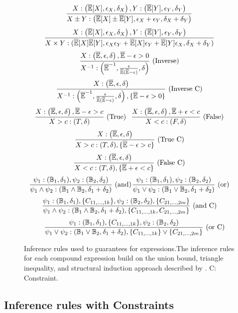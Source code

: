 \begin{subappendices}
\begin{figure}
\[
\dfrac{X: \left(\overline{\mathbb{E}}[X], \epsilon_X, \delta_X\right), Y: \left(\overline{\mathbb{E}}[Y], \epsilon_Y, \delta_Y\right)}{X \pm Y: \left(\overline{\mathbb{E}}[X] \pm \overline{\mathbb{E}}[Y], \epsilon_X + \epsilon_Y, \delta_X + \delta_Y\right)}
\]
\[
\dfrac{X: \left(\overline{\mathbb{E}}[X], \epsilon_X, \delta_X\right), Y: \left(\overline{\mathbb{E}}[Y], \epsilon_Y, \delta_Y\right)}{ X \times Y: (\overline{\mathbb{E}}[X] \overline{\mathbb{E}}[Y], \epsilon_X \epsilon_Y + \overline{\mathbb{E}}[X] \epsilon_Y + \overline{\mathbb{E}}[Y] \epsilon_X, \delta_X + \delta_Y)} 
\]
\[
\dfrac{X: \left(\overline{\mathbb{E}}, \epsilon, \delta \right), \overline{\mathbb{E}} - \epsilon > 0}{ X^{-1}: \left(\overline{\mathbb{E}}^{-1}, \frac{\epsilon}{\overline{\mathbb{E}} (\overline{\mathbb{E}} - \epsilon)}  , \delta \right)}\text{ (Inverse)} 
\] 
\[
\dfrac{X: \left(\overline{\mathbb{E}}, \epsilon, \delta \right)}{ X^{-1}: \left(\overline{\mathbb{E}}^{-1}, \frac{\epsilon}{\overline{\mathbb{E}} (\overline{\mathbb{E}} - \epsilon)}  , \delta \right), \{ \overline{\mathbb{E}} - \epsilon > 0\}} \text{ (Inverse C)}
\]
\[
\dfrac{X: \left(\overline{\mathbb{E}}, \epsilon, \delta\right), \overline{\mathbb{E}} - \epsilon > c}{ X > c: (T, \delta)} \text{ (True)} \hspace{0.1in} \dfrac{X: \left(\overline{\mathbb{E}}, \epsilon, \delta \right), \overline{\mathbb{E}}  + \epsilon < c}{ X < c: (F, \delta)} \text{ (False)} 
\] 
\[
\dfrac{X: \left(\overline{\mathbb{E}}, \epsilon, \delta\right)}{ X > c: (T, \delta), \{\overline{\mathbb{E}} - \epsilon > c\}} \text{ (True C)} \]
\[
\dfrac{X: \left(\overline{\mathbb{E}}, \epsilon, \delta \right)}{ X < c: (T, \delta), \{\overline{\mathbb{E}} + \epsilon < c\}} \text{ (False C)} 
\] 
\[
\dfrac{\psi_1: (\mathbb{B}_1, \delta_1), \psi_2: (\mathbb{B}_2, \delta_2)}{\psi_1 \wedge \psi_2: (\mathbb{B}_1 \wedge \mathbb{B}_2, \delta_1 + \delta_2)} \text{ (and)} \hspace{0.01in} \dfrac{\psi_1: (\mathbb{B}_1, \delta_1), \psi_2: (\mathbb{B}_2, \delta_2)}{\psi_1 \vee \psi_2: (\mathbb{B}_1 \vee \mathbb{B}_2, \delta_1 + \delta_2)} \text{ (or)}
\]
\[
\dfrac{\psi_1: (\mathbb{B}_1, \delta_1), \{C_{11, \dots, 1k}\}, \psi_2: (\mathbb{B}_2, \delta_2), \{C_{21, \dots, 2m}\}}{\psi_1 \wedge \psi_2: (\mathbb{B}_1 \wedge \mathbb{B}_2, \delta_1 + \delta_2), \{C_{11, \dots, 1k}, C_{21, \dots, 2m}\}} \text{ (and C)} \]
\[
\hspace{0.2in} \dfrac{\psi_1: (\mathbb{B}_1, \delta_1), \{C_{11, \dots, 1k}\}, \psi_2: (\mathbb{B}_2, \delta_2)}{\psi_1 \vee \psi_2: (\mathbb{B}_1 \vee \mathbb{B}_2, \delta_1 + \delta_2),  \{C_{11, \dots, 1k}\} \vee \{C_{21, \dots, 2m}\}} \text{ (or C)}
\]%
\caption{Inference rules used to guarantees for expressions.The inference rules for each compound expression build on the union bound, triangle inequality, and structural induction approach described by \citet{bastani2019probabilistic}. C: Constraint.}
\label{fig:inference}
\end{figure}
\subsection{Inference rules with Constraints}
\label{sec:appendix:constraint:proofs}


\end{subappendices}
